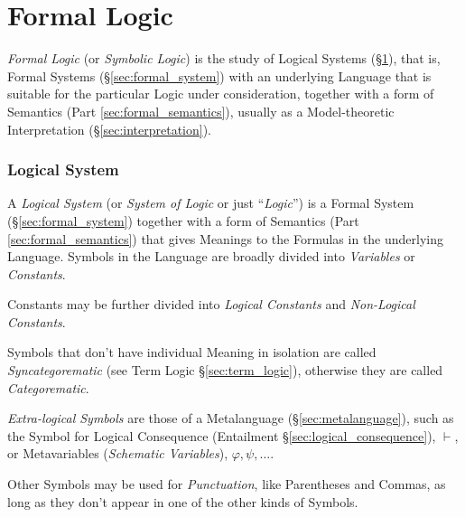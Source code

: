 \part{Formal Logic}\label{sec:formal_logic}

\emph{Formal Logic} (or \emph{Symbolic Logic}) is the study of Logical
Systems (\S\ref{sec:logical_system}), that is, Formal Systems
(\S\ref{sec:formal_system}) with an underlying Language that is
suitable for the particular Logic under consideration, together with a
form of Semantics (Part \ref{sec:formal_semantics}), usually as a
Model-theoretic Interpretation (\S\ref{sec:interpretation}).



\section{Logical System}\label{sec:logical_system}

A \emph{Logical System} (or \emph{System of Logic} or just
``\emph{Logic}'') is a Formal System (\S\ref{sec:formal_system}) together
with a form of Semantics (Part \ref{sec:formal_semantics}) that gives
Meanings to the Formulas in the underlying Language. Symbols in the
Language are broadly divided into \emph{Variables} or
\emph{Constants}.

Constants may be further divided into \emph{Logical Constants} and
\emph{Non-Logical Constants}.

Symbols that don't have individual Meaning in isolation are called
\emph{Syncategorematic} (see Term Logic \S\ref{sec:term_logic}),
otherwise they are called \emph{Categorematic}.

\emph{Extra-logical Symbols} are those of a Metalanguage
(\S\ref{sec:metalanguage}), such as the Symbol for Logical Consequence
(Entailment \S\ref{sec:logical_consequence}), $\vdash$, or
Metavariables (\emph{Schematic Variables}), $\varphi, \psi, \ldots$.

Other Symbols may be used for \emph{Punctuation}, like Parentheses and
Commas, as long as they don't appear in one of the other kinds of
Symbols.



